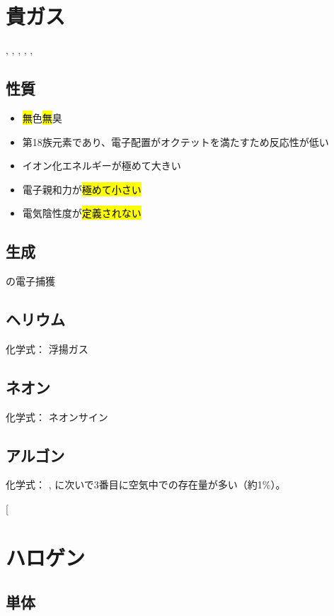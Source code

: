 \section{貴ガス}
\hl{}, \hl{}, \hl{}, \hl{}, , 
\subsection{性質}
\begin{itemize}
      \item \hl{無}色\hl{無}臭
      \item 第18族元素であり、電子配置がオクテットを満たすため反応性が低い
      \item イオン化エネルギーが極めて大きい
      \item 電子親和力が\hl{極めて小さい}
      \item 電気陰性度が\hl{定義されない}
\end{itemize}
\subsection{生成}
の電子捕獲\\
\quad{}
\subsection{ヘリウム}
化学式：
浮揚ガス
\subsection{ネオン}
化学式：
ネオンサイン
\subsection{アルゴン}
化学式：
, に次いで3番目に空気中での存在量が多い（約1\%）。

\newpage
\twocolumn[
      \section{ハロゲン}
      \subsection{単体}
